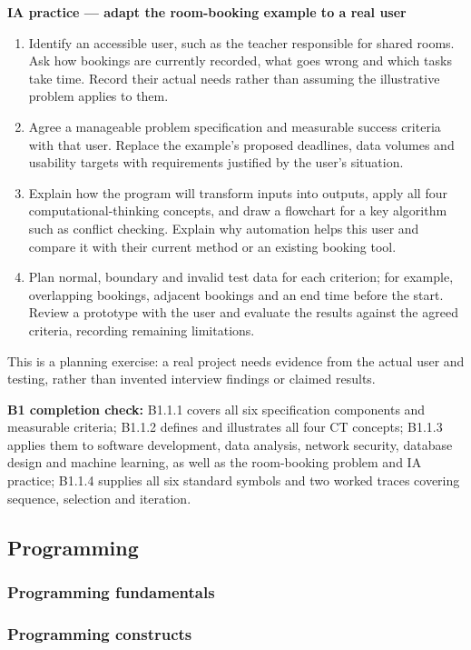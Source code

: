 \documentclass[a4paper,12pt]{article}
\begin{document}
\newpage
\textbf{IA practice --- adapt the room-booking example to a real user}
\begin{enumerate}
    \item Identify an accessible user, such as the teacher responsible for shared rooms. Ask how bookings are currently recorded, what goes wrong and which tasks take time. Record their actual needs rather than assuming the illustrative problem applies to them.
    \item Agree a manageable problem specification and measurable success criteria with that user. Replace the example's proposed deadlines, data volumes and usability targets with requirements justified by the user's situation.
    \item Explain how the program will transform inputs into outputs, apply all four computational-thinking concepts, and draw a flowchart for a key algorithm such as conflict checking. Explain why automation helps this user and compare it with their current method or an existing booking tool.
    \item Plan normal, boundary and invalid test data for each criterion; for example, overlapping bookings, adjacent bookings and an end time before the start. Review a prototype with the user and evaluate the results against the agreed criteria, recording remaining limitations.
\end{enumerate}
This is a planning exercise: a real project needs evidence from the actual user and testing, rather than invented interview findings or claimed results.

\textbf{B1 completion check:} B1.1.1 covers all six specification components and measurable criteria; B1.1.2 defines and illustrates all four CT concepts; B1.1.3 applies them to software development, data analysis, network security, database design and machine learning, as well as the room-booking problem and IA practice; B1.1.4 supplies all six standard symbols and two worked traces covering sequence, selection and iteration.


\endgroup
\subsection{Programming}
\subsubsection{Programming fundamentals}
\subsubsection{Programming constructs}
\end{document}
